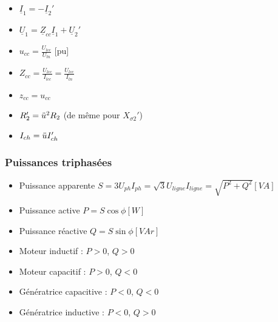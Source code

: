 \documentclass[../main.tex]{subfiles}
\begin{document}
\begin{itemize}
    \item $\underline{I}_1 = -\underline{I}_2'$\\
    \item $\underline{U}_1 = \underline{Z}_{cc} \underline{I}_1 + \underline{U}_2'$\\
    \item $u_{cc} = \frac{U_{lcc}}{U_{ln}}$ [pu]\\
    \item $Z_{cc} = \frac{U_{lcc}}{I_{lcc}} = \frac{U_{lcc}}{I_{ln}}$\\
    \item $z_{cc} = u_{cc}$\\
    \item $R_2' = \Ddot{u}^2 R_2$ (de même pour $X_{\sigma2}'$)\\
    \item $I_{ch} = \Ddot{u} I_{ch}'$\\
\end{itemize}


\subsubsection{Puissances triphasées}
\begin{itemize}
    \item Puissance apparente $S = 3U_{ph} I_{ph} = \sqrt{3}U_{ligne} I_{ligne} = \sqrt{P^2+Q^2}[VA]$\\
    \item Puissance active $P = S \cos{\phi} [W]$\\
    \item Puissance réactive $Q = S \sin{\phi} [VAr]$\\ 
\end{itemize}

\begin{itemize}
    \item Moteur inductif : $P>0$, $Q>0$\\
    \item Moteur capacitif : $P>0$, $Q<0$\\
    \item Génératrice capacitive : $P<0$, $Q<0$\\
    \item Génératrice inductive : $P<0$, $Q>0$\\
\end{itemize}
\end{document}
